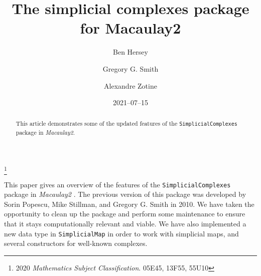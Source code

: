 \documentclass[12pt,leqno]{amsart}
\theoremstyle{definition}
\begin{document}
\title[Simplicial Complexes]{The simplicial complexes package for Macaulay2}
\author[B.~Hersey]{Ben Hersey}
\address{Ben Hersey: Department of Mathematics and Statistics, Queen's
  University, Kingston, Ontario, K7L 3N6;
  {\normalfont\texttt{b.hersey@queensu.ca}}}

\author[G.G.~Smith]{Gregory G.{} Smith}
\address{Gregory G.{} Smith: Department of Mathematics and Statistics, Queen's
  University, Kingston, Ontario, K7L 3N6, Canada;
  {\normalfont\texttt{ggsmith@mast.queensu.ca}}}

\author[A.~Zotine]{Alexandre Zotine}
\address{Alexandre Zotine: Department of Mathematics and Statistics, Queen's
  University, Kingston, Ontario, K7L 3N6;
  {\normalfont\texttt{18az45@queensu.ca}}}

\thanks{2020 \emph{Mathematics Subject Classification}. 05E45, 13F55,
  55U10%
}
\date{2021--07--15}

\begin{abstract}
  This article demonstrates some of the updated features of the
  \texttt{SimplicialComplexes} package in \emph{Macaulay2}.
\end{abstract}

\maketitle


\addtocounter{section}{0}
\addtocounter{lemma}{-1}

\noindent
This paper gives an overview of the features of the
\texttt{SimplicialComplexes} package in \emph{Macaulay2} \cite{M2}. The
previous version of this package was developed by Sorin Popescu, Mike
Stillman, and Gregory G. Smith in 2010. We have taken the opportunity to clean
up the package and perform some maintenance to ensure that it stays
computationally relevant and viable. We have also implemented a new data type
in \texttt{SimplicialMap} in order to work with simplicial maps, and several
constructors for well-known complexes.
\end{document}
